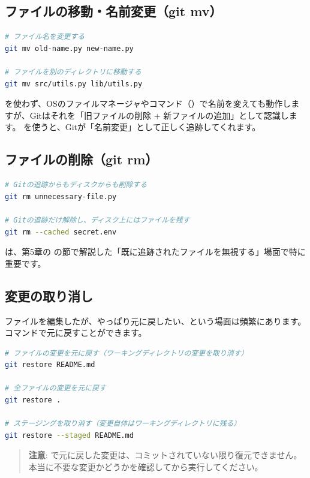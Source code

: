 \subsection{ファイルの移動・名前変更（git mv）}

\begin{lstlisting}[language=bash]
# ファイル名を変更する
git mv old-name.py new-name.py

# ファイルを別のディレクトリに移動する
git mv src/utils.py lib/utils.py
\end{lstlisting}

 を使わず、OSのファイルマネージャやコマンド（）で名前を変えても動作しますが、Gitはそれを「旧ファイルの削除 + 新ファイルの追加」として認識します。 を使うと、Gitが「名前変更」として正しく追跡してくれます。

\subsection{ファイルの削除（git rm）}

\begin{lstlisting}[language=bash]
# Gitの追跡からもディスクからも削除する
git rm unnecessary-file.py

# Gitの追跡だけ解除し、ディスク上にはファイルを残す
git rm --cached secret.env
\end{lstlisting}

 は、第5章の  の節で解説した「既に追跡されたファイルを無視する」場面で特に重要です。

\subsection{変更の取り消し}

ファイルを編集したが、やっぱり元に戻したい、という場面は頻繁にあります。 コマンドで元に戻すことができます。

\begin{lstlisting}[language=bash]
# ファイルの変更を元に戻す（ワーキングディレクトリの変更を取り消す）
git restore README.md

# 全ファイルの変更を元に戻す
git restore .

# ステージングを取り消す（変更自体はワーキングディレクトリに残る）
git restore --staged README.md
\end{lstlisting}

\begin{quote}
\textbf{注意}:  で元に戻した変更は、コミットされていない限り復元できません。本当に不要な変更かどうかを確認してから実行してください。
\end{quote}

